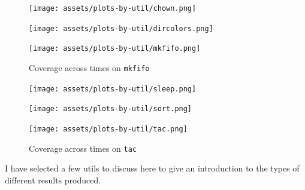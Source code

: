 \documentclass{article}
\begin{document}
\begin{figure}[htbp]
    \centering
    \begin{minipage}[b]{0.3\linewidth}
        \texttt{[image: assets/plots-by-util/chown.png]}
        \captionsetup{width=0.9\linewidth}
        \caption{Coverage across times on \lstinline{chown}}
        \label{fig:cov_chown}
    \end{minipage}
    \hfill
    \begin{minipage}[b]{0.3\linewidth}
        \texttt{[image: assets/plots-by-util/dircolors.png]}
        \captionsetup{width=0.9\linewidth}
        \caption{Coverage across times on \lstinline{dircolors}}
        \label{fig:cov_dircolors}
    \end{minipage}
    \hfill
    \begin {minipage}[b]{0.3\linewidth}
    \texttt{[image: assets/plots-by-util/mkfifo.png]}
    \captionsetup{width=0.9\linewidth}
    \caption{Coverage across times on \lstinline{mkfifo}}
    \label{fig:cov_mkfifo}
    \end{minipage}
\end{figure}

\begin{figure}[htbp]
    \centering
    \begin {minipage}[b]{0.3\linewidth}
    \texttt{[image: assets/plots-by-util/sleep.png]}
    \captionsetup{width=0.9\linewidth}
    \caption{Coverage across times on \lstinline{sleep}}
    \label{fig:cov_sleep}
    \end{minipage}
    \hfill
    \begin {minipage}[b]{0.3\linewidth}
    \texttt{[image: assets/plots-by-util/sort.png]}
    \captionsetup{width=0.9\linewidth}
    \caption{Coverage across times on \lstinline{sort}}
    \label{fig:cov_sort}
    \end{minipage}
    \hfill
    \begin {minipage}[b]{0.3\linewidth}
    \texttt{[image: assets/plots-by-util/tac.png]}
    \captionsetup{width=0.9\linewidth}
    \caption{Coverage across times on \lstinline{tac}}
    \label{fig:cov_tac}
    \end{minipage}
\end{figure}

I have selected a few utils to discuss here to give an introduction to the types of different results produced.
\end{document}
